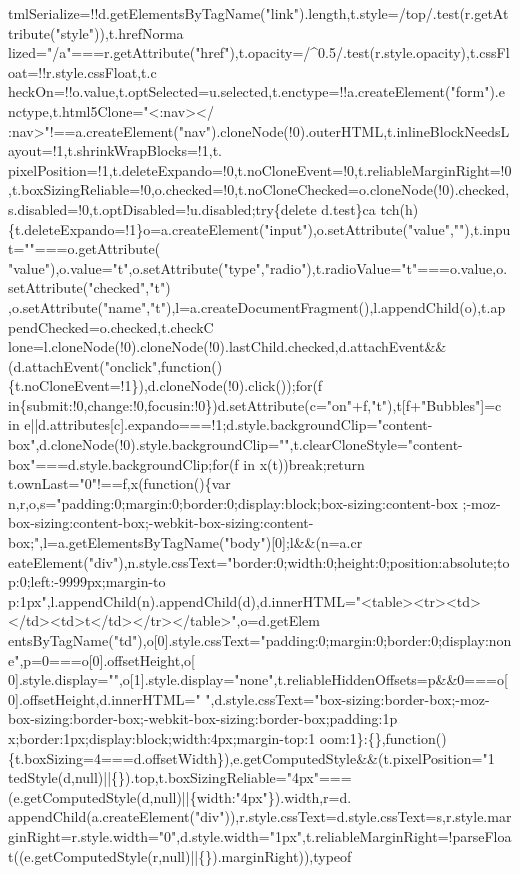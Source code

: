 \begin{DoxyCode}
{      tmlSerialize=!!d.getElementsByTagName("link").length,t.style=/top/.test(r.getAttribute("style")),t.hrefNorma
      lized="/a"===r.getAttribute("href"),t.opacity=/^0.5/.test(r.style.opacity),t.cssFloat=!!r.style.cssFloat,t.c
      heckOn=!!o.value,t.optSelected=u.selected,t.enctype=!!a.createElement("form").enctype,t.html5Clone="<:nav></
      :nav>"!==a.createElement("nav").cloneNode(!0).outerHTML,t.inlineBlockNeedsLayout=!1,t.shrinkWrapBlocks=!1,t.
      pixelPosition=!1,t.deleteExpando=!0,t.noCloneEvent=!0,t.reliableMarginRight=!0,t.boxSizingReliable=!0,o.checked=!0,t.noCloneChecked=o.cloneNode(!0).checked,s.disabled=!0,t.optDisabled=!u.disabled;try\{delete
       d.test\}ca
      tch(h)\{t.deleteExpando=!1\}o=a.createElement("input"),o.setAttribute("value",""),t.input=""===o.getAttribute(
      "value"),o.value="t",o.setAttribute("type","radio"),t.radioValue="t"===o.value,o.setAttribute("checked","t")
      ,o.setAttribute("name","t"),l=a.createDocumentFragment(),l.appendChild(o),t.appendChecked=o.checked,t.checkC
      lone=l.cloneNode(!0).cloneNode(!0).lastChild.checked,d.attachEvent&&(d.attachEvent("onclick",function()\{t.noCloneEvent=!1\}),d.cloneNode(!0).click());for(f
       in\{submit:!0,change:!0,focusin:!0\})d.setAttribute(c="on"+f,"t"),t[f+"Bubbles"]=c in
       e||d.attributes[c].expando===!1;d.style.backgroundClip="content-box",d.cloneNode(!0).style.backgroundClip="",t.clearCloneStyle="content-box"===d.style.backgroundClip;for(f in x(t))break;return
       t.ownLast="0"!==f,x(function()\{var
       n,r,o,s="padding:0;margin:0;border:0;display:block;box-sizing:content-box
      ;-moz-box-sizing:content-box;-webkit-box-sizing:content-box;",l=a.getElementsByTagName("body")[0];l&&(n=a.cr
      eateElement("div"),n.style.cssText="border:0;width:0;height:0;position:absolute;top:0;left:-9999px;margin-to
      p:1px",l.appendChild(n).appendChild(d),d.innerHTML="<table><tr><td></td><td>t</td></tr></table>",o=d.getElem
      entsByTagName("td"),o[0].style.cssText="padding:0;margin:0;border:0;display:none",p=0===o[0].offsetHeight,o[
      0].style.display="",o[1].style.display="none",t.reliableHiddenOffsets=p&&0===o[0].offsetHeight,d.innerHTML="
      ",d.style.cssText="box-sizing:border-box;-moz-box-sizing:border-box;-webkit-box-sizing:border-box;padding:1p
      x;border:1px;display:block;width:4px;margin-top:1%
      oom:1\}:\{\},function()\{t.boxSizing=4===d.offsetWidth\}),e.getComputedStyle&&(t.pixelPosition="1%
      tedStyle(d,null)||\{\}).top,t.boxSizingReliable="4px"===(e.getComputedStyle(d,null)||\{width:"4px"\}).width,r=d.
      appendChild(a.createElement("div")),r.style.cssText=d.style.cssText=s,r.style.marginRight=r.style.width="0",d.style.width="1px",t.reliableMarginRight=!parseFloat((e.getComputedStyle(r,null)||\{\}).marginRight)),typeof
       
}
\end{DoxyCode}
